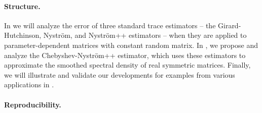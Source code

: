 \paragraph{Structure.} In  we will analyze the error of three standard trace estimators -- the Girard-Hutchinson, Nyström, and Nyström++ estimators -- when they are applied to parameter-dependent matrices with constant random matrix. In , we propose and analyze the Chebyshev-Nyström++ estimator, which uses these estimators to approximate the smoothed spectral density of real symmetric matrices. Finally, we will illustrate and validate our developments for examples from various applications in .

\paragraph{Reproducibility.} 
